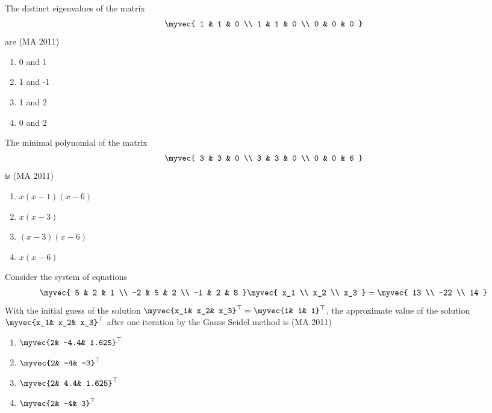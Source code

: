\item The distinct eigenvalues of the matrix
\begin{align*}
 \myvec{
1 & 1 & 0 \\
1 & 1 & 0 \\
0 & 0 & 0
}
\end{align*}
are
\hfill{(MA 2011)}
\begin{multicols}{4}
\begin{enumerate}
    \item 0 and 1
    \item 1 and -1
    \item 1 and 2 
    \item 0 and 2
\end{enumerate}
\end{multicols}
\item The minimal polynomial of the matrix
\begin{align*}
\myvec{
3 & 3 & 0 \\
3 & 3 & 0 \\
0 & 0 & 6
}
\end{align*}
is
\hfill{(MA 2011)}
\begin{multicols}{4}
\begin{enumerate}
    \item $x(x-1)(x-6)$
    \item $x(x-3)$
    \item $(x-3)(x-6)$
    \item  $x(x-6)$
\end{enumerate}
\end{multicols}
\item Consider the system of equations
\begin{align*}
\myvec{
5 & 2 & 1 \\
-2 & 5 & 2 \\
-1 & 2 & 8
}
\myvec{
x_1 \\ x_2 \\ x_3
}
=
\myvec{
13 \\ -22 \\ 14
}
\end{align*}
With the initial guess of the solution $\myvec{x_1& x_2& x_3}^{\top} = \myvec{1& 1& 1}^{\top}$, the approximate value of the solution $\myvec{x_1& x_2& x_3}^{\top}$ after one iteration by the Gauss Seidel method is
\hfill{(MA 2011)}
\begin{multicols}{2}
\begin{enumerate}
    \item $\myvec{2& -4.4& 1.625}^{\top}$
    \item $\myvec{2& -4& -3}^{\top}$
    \item  $\myvec{2& 4.4& 1.625}^{\top}$ 
    \item $\myvec{2& -4& 3}^{\top}$
\end{enumerate}
\end{multicols}

